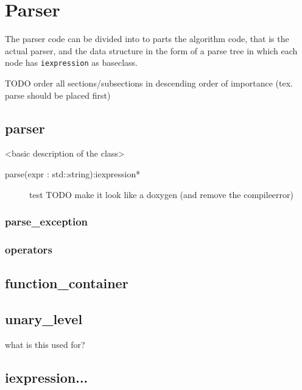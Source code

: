 \documentclass[a4paper,11pt]{kth-mag}
\begin{document}
\section{Parser}
The parser code can be divided into to parts the algorithm code, that is the actual parser, and the data structure in the form of a parse tree in which each node has \texttt{iexpression} as baseclass.

TODO order all sections/subsections in descending order of importance (tex. parse should be placed first)
\subsection{parser}
<basic description of the class>
\begin{description}
    \item[parse(expr : std::string):iexpression*] test
        TODO make it look like a doxygen (and remove the compileerror)

\end{description}
\subsubsection{parse_exception}
\subsubsection{operators}

\subsection{function_container}
\subsection{unary_level}
what is this used for?
\subsection{iexpression...}
\end{document}

